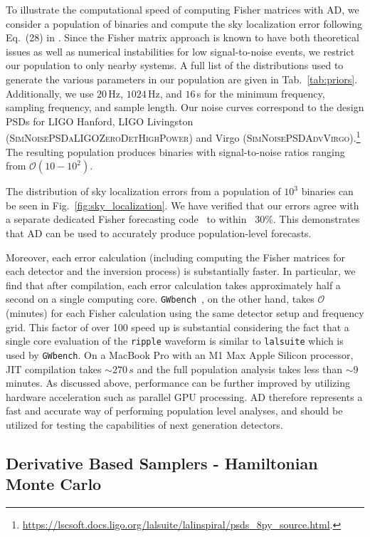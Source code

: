 \documentclass[twocolumn]{aastex631}
\newcommand{\ripple}{\texttt{ripple}\xspace}
\newcommand{\lalsuite}{\texttt{lalsuite}\xspace}
\begin{document}
To illustrate the computational speed of computing Fisher matrices with AD, we consider a population of binaries and compute the sky localization error following Eq.~(28) in \cite{Iacovelli:2022bbs, Iacovelli:2022mbg}.
Since the Fisher matrix approach is known to have both theoretical issues as well as numerical instabilities for low signal-to-noise events, we restrict our population to only nearby systems.
A full list of the distributions used to generate the various parameters in our population are given in Tab.~\ref{tab:priors}. 
Additionally, we use $20\,$Hz, $1024\,$Hz, and $16\,$s for the minimum frequency, sampling frequency, and sample length.
Our noise curves correspond to the design PSDs for LIGO Hanford, LIGO Livingston (\textsc{SimNoisePSDaLIGOZeroDetHighPower}) and Virgo (\textsc{SimNoisePSDAdvVirgo}).\footnote{\url{https://lscsoft.docs.ligo.org/lalsuite/lalinspiral/psds_8py_source.html}.}
The resulting population produces binaries with signal-to-noise ratios ranging from $\mathcal{O}(10-10^2)$.

The distribution of sky localization errors from a population of $10^3$ binaries can be seen in Fig.~\ref{fig:sky_localization}.
We have verified that our errors agree with a separate dedicated Fisher forecasting code~\citep{Borhanian:2020ypi} to within ~30\%.
This demonstrates that AD can be used to accurately produce population-level forecasts.

Moreover, each error calculation (including computing the Fisher matrices for each detector and the inversion process) is substantially faster.
In particular, we find that after compilation, each error calculation takes approximately half a second on a single computing core.
\texttt{GWbench}~\citep{Borhanian:2020ypi}, on the other hand, takes $\mathcal{O}$(minutes) for each Fisher calculation using the same detector setup and frequency grid.
This factor of over 100 speed up is substantial considering the fact that a single core evaluation of the \ripple waveform is similar to \lalsuite which is used by \texttt{GWbench}.
On a MacBook Pro with an M1 Max Apple Silicon processor, JIT compilation takes $\sim 270\,s$ and the full population analysis takes less than $\sim 9$ minutes.
As discussed above, performance can be further improved by utilizing hardware acceleration such as parallel GPU processing.
AD therefore represents a fast and accurate way of performing population level analyses, and should be utilized for testing the capabilities of next generation detectors.

\subsection{Derivative Based Samplers - Hamiltonian Monte Carlo}
\label{subsec:hmc}
\end{document}
